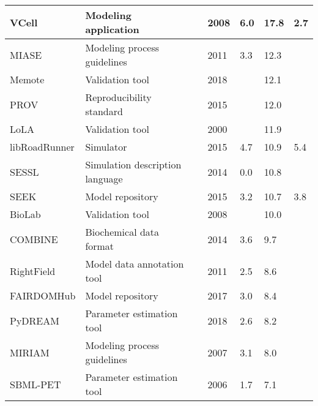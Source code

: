 \begin{longtable}{L{2.2cm}L{4cm}L{1cm}L{0.8cm}R{1.1cm}R{1cm}R{1cm}}
\midrule
\small{VCell} &\small{Modeling application} &\cite{moraru2008virtual} &\small{2008} &\small{6.0} &\small{17.8} &\small{2.7}\\
\midrule
\small{MIASE} &\small{Modeling process guidelines} &\cite{Waltemath2011MinimumMIASE} &\small{2011} &\small{3.3} &\small{12.3} &\small{}\\
\midrule
\small{Memote} &\small{Validation tool} &\cite{Lieven2018Memote:Suite} &\small{2018} &\small{} &\small{12.1} &\small{}\\
\midrule
\small{PROV} &\small{Reproducibility standard} &\cite{Moreau2015ThePROV} &\small{2015} &\small{} &\small{12.0} &\small{}\\
\midrule
\small{LoLA} &\small{Validation tool} &\cite{Schmidt2000LoLAAnalyser} &\small{2000} &\small{} &\small{11.9} &\small{}\\
\midrule
\small{libRoadRunner} &\small{Simulator} &\cite{Somogyi2015LibRoadRunner:Library.} &\small{2015} &\small{4.7} &\small{10.9} &\small{5.4}\\
\midrule
\small{SESSL} &\small{Simulation description language} &\cite{Ewald2014SESSL:Experiments} &\small{2014} &\small{0.0} &\small{10.8} &\small{}\\
\midrule
\small{SEEK} &\small{Model repository} &\cite{Wolstencroft2015SEEK:Platform} &\small{2015} &\small{3.2} &\small{10.7} &\small{3.8}\\
\midrule
\small{BioLab} &\small{Validation tool} &\cite{Clarke2008StatisticalPathway} &\small{2008} &\small{} &\small{10.0} &\small{}\\
\midrule
\small{COMBINE} &\small{Biochemical data format} &\cite{Bergmann2014COMBINEProject} &\small{2014} &\small{3.6} &\small{9.7} &\small{}\\
\midrule
\small{RightField} &\small{Model data annotation tool} &\cite{Wolstencroft2011RightField:Spreadsheets} &\small{2011} &\small{2.5} &\small{8.6} &\small{}\\
\midrule
\small{FAIRDOMHub} &\small{Model repository} &\cite{Wolstencroft2017FAIRDOMHub:Research.} &\small{2017} &\small{3.0} &\small{8.4} &\small{}\\
\midrule
\small{PyDREAM} &\small{Parameter estimation tool} &\cite{Shockley2018PyDREAM:Python} &\small{2018} &\small{2.6} &\small{8.2} &\small{}\\
\midrule
\small{MIRIAM} &\small{Modeling process guidelines} &\cite{Laibe2007MIRIAMBiology.} &\small{2007} &\small{3.1} &\small{8.0} &\small{}\\
\midrule
\small{SBML-PET} &\small{Parameter estimation tool} &\cite{Zi2006SBML-PET:Tool} &\small{2006} &\small{1.7} &\small{7.1} &\small{}\\

\end{longtable}
